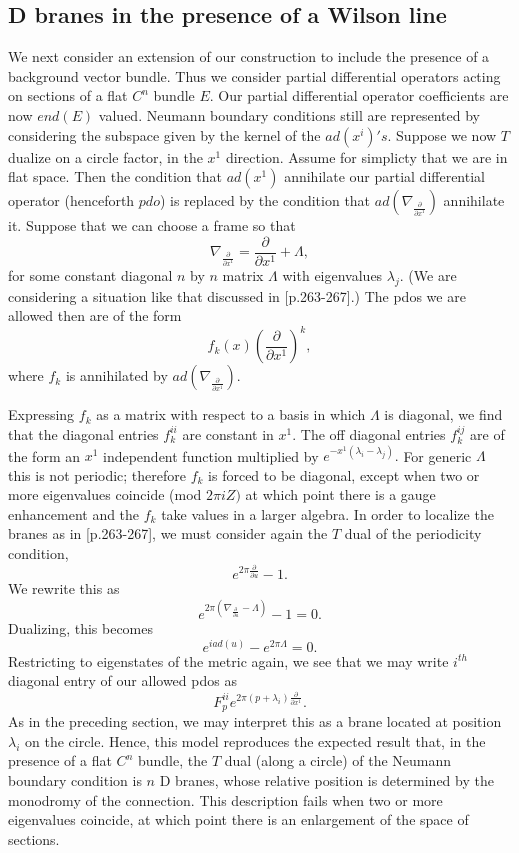 \documentclass[a4paper,11pt]{amsart}
\begin{document}
\subsection{D branes in the presence of a Wilson line}
We next consider an extension of our construction to include the presence of a
background vector bundle. Thus we consider partial differential operators 
acting on sections of a flat $C^n$ bundle $E$. Our partial differential
 operator coefficients are now $end(E)$ valued. Neumann boundary
conditions still are represented by considering the subspace given by the 
kernel of the $ad(x^i)'s$. Suppose we now $T$ 
dualize on a circle factor, in the $x^1$ direction. Assume for simplicty
 that we are in flat space. Then the condition that 
$ad(x^1)$ annihilate our partial differential operator (henceforth $pdo$)
 is replaced by the condition that  
$ad(\nabla_{\frac{\partial}{\partial x^1}})$ annihilate it. Suppose that 
we can choose a frame so that 
$$\nabla_{\frac{\partial}{\partial x^1}} = \frac{\partial}{\partial x^1} + \Lambda,$$
for some constant diagonal $n$ by $n$ matrix $\Lambda$ with eigenvalues
$\lambda_j$. (We are considering a situation like that discussed
in \cite{P}[p.263-267].) The pdos we are allowed then are of the form 
$$f_k(x)(\frac{\partial}{\partial x^1})^k,$$ 
where 
$f_k$ is annihilated by $ad(\nabla_{\frac{\partial}{\partial x^1}}).$  

Expressing $f_k$ as a matrix with respect to a basis in which $\Lambda$ is 
diagonal, we find that the diagonal entries $f_k^{ii}$ are constant in $x^1
$. 
The off diagonal entries $f_k^{ij}$ are of the form an $x^1$ independent
function multiplied by $e^{-x^1(\lambda_i -\lambda_j)}.$ For generic $\Lambda$ 
this is not periodic; therefore $f_k$ is forced to be diagonal, except when two
or more eigenvalues coincide (mod $2\pi iZ)$ at which point there is a gauge
enhancement and the $f_k$ take values in a larger algebra. In order to localize 
the branes as in \cite{P}[p.263-267], we must consider again the $T$ dual of the
periodicity condition, 
$$e^{2\pi\frac{\partial}{\partial u}} - 1.$$
We rewrite this as 
$$e^{2\pi(\nabla_{\frac{\partial}{\partial u}}-\Lambda)} - 1 = 0.$$
Dualizing, this becomes 
$$e^{i ad(u)} - e^{2\pi\Lambda} = 0.$$
Restricting to eigenstates of the metric again, we see that we may write 
$i^{th}$ diagonal entry of our allowed pdos as 
$$F_p^{ii}e^{2\pi(p+\lambda_i)\frac{\partial}{\partial x^1}}.$$
 As in the preceding section, we may
 interpret this as a brane located at position $\lambda_i$ on the circle. 
Hence,  this model reproduces
the expected result that, in the presence of a flat $C^n$ bundle,
 the $T$ dual (along a circle) of the Neumann boundary
condition is $n$ D branes, whose relative position is determined by the
monodromy of the connection. 
This description fails when two or more eigenvalues
coincide, at which point there is an enlargement of the space of sections. 
\end{document}
